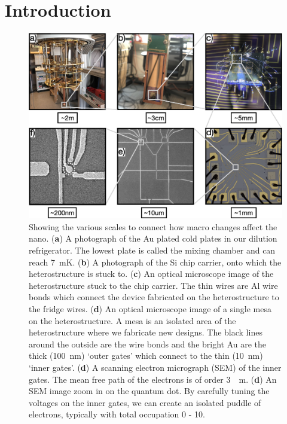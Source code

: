 \chapter{Introduction}\label{cha:intro}


\begin{figure}[!htb]
 \begin{center}
  \includegraphics[width=1.0\textwidth]{figures/ch1/crop_FiguresMaster.001.png}
  \caption[Dilution fridge to quantum dot scale breakdown]{\label{fig:ch1/scale_breakdown} 
  Showing the various scales to connect how macro changes affect the nano. (\textbf{a}) A photograph of the Au plated cold plates in our dilution refrigerator. The lowest plate is called the mixing chamber and can reach \qty{7}{mK}. (\textbf{b}) A photograph of the Si chip carrier, onto which the heterostructure is stuck to. (\textbf{c}) An optical microscope image of the heterostructure stuck to the chip carrier. The thin wires are Al wire bonds which connect the device fabricated on the heterostructure to the fridge wires. (\textbf{d}) An optical microscope image of a single mesa on the heterostructure. A mesa is an isolated area of the heterostructure where we fabricate new designs. The black lines around the outside are the wire bonds and the bright Au are the thick (\qty{100}{nm}) `outer gates' which connect to the thin (\qty{10}{nm}) `inner gates'. (\textbf{d}) A scanning electron micrograph (SEM) of the inner gates. The mean free path of the electrons is of order \qty{3}{\mu m}. (\textbf{d}) An SEM image zoom in on the quantum dot. By carefully tuning the voltages on the inner gates, we can create an isolated puddle of electrons, typically with total occupation 0 - 10. 
   }
 \end{center}
\end{figure}


